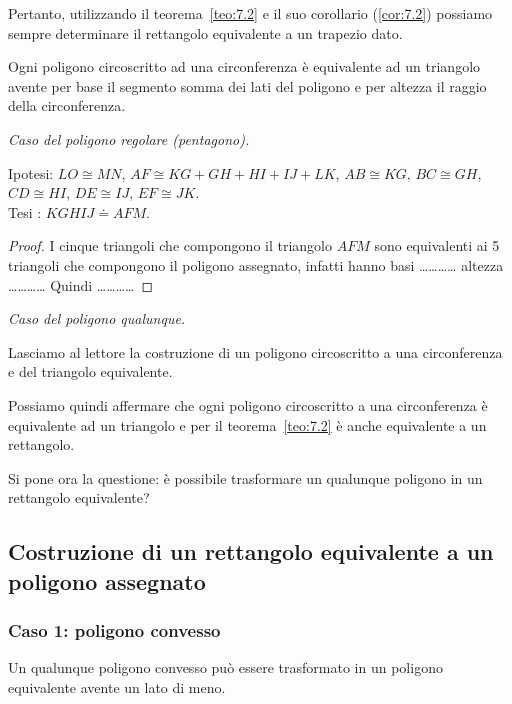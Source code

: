 Pertanto, utilizzando il teorema~\ref{teo:7.2} e il suo corollario (\ref{cor:7.2}) possiamo sempre determinare il rettangolo equivalente a un trapezio dato.

\begin{teorema}\label{teo:7.4}
Ogni poligono circoscritto ad una circonferenza è equivalente ad un triangolo avente per base il segmento somma dei lati del poligono e per altezza il raggio della circonferenza.
\end{teorema}

\noindent \emph{Caso del poligono regolare (pentagono).}\vspace{10pt}

\noindent Ipotesi: $LO\cong MN$, $AF\cong KG+GH+HI+IJ+LK$, $AB\cong KG$, $BC\cong GH$, $CD\cong HI$, $DE\cong IJ$, $EF\cong JK$.\\
Tesi : $KGHIJ\doteq AFM$.

\begin{figure*}[!htb]
	\centering
\end{figure*}

\begin{proof}
I cinque triangoli che compongono il triangolo $AFM$ sono equivalenti ai 5 triangoli che compongono il poligono assegnato, infatti hanno basi \ldots\ldots\ldots\ldots{} altezza \ldots\ldots\ldots\ldots{} 
Quindi \ldots\ldots\ldots\ldots{}
\end{proof}\vspace{10pt}

\noindent \emph{Caso del poligono qualunque.}\vspace{10pt}

\noindent Lasciamo al lettore la costruzione di un poligono circoscritto a una circonferenza e del triangolo equivalente.\vspace{10pt}

Possiamo quindi affermare che ogni poligono circoscritto a una circonferenza è equivalente ad un triangolo e per il teorema~\ref{teo:7.2} è anche equivalente a un rettangolo.

Si pone ora la questione: è possibile trasformare un qualunque poligono in un rettangolo equivalente?

\subsection{Costruzione di un rettangolo equivalente a un poligono assegnato}

\subsubsection{Caso 1: poligono convesso}
Un qualunque poligono convesso può essere trasformato in un poligono equivalente avente un lato di meno.

